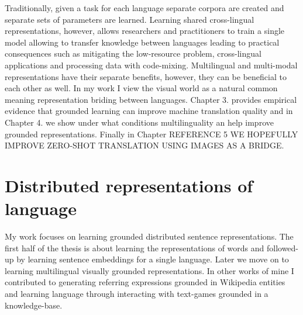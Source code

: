 Traditionally, given a task for each language separate corpora are created and separate sets of parameters are learned.
Learning shared cross-lingual representations, however, allows researchers and practitioners
to train a single model allowing to transfer knowledge between languages leading to practical consequences
such as mitigating the low-resource problem, cross-lingual applications and processing data with code-mixing.
Multilingual and multi-modal representations have their separate benefits, however, they can be beneficial
to each other as well. In my work I view the visual world as a natural common meaning representation briding
between languages. Chapter 3. provides empirical evidence that grounded learning can improve machine
translation quality and in Chapter 4. we show under what conditions multilinguality an help improve grounded
representations. Finally in Chapter REFERENCE 5 WE HOPEFULLY IMPROVE ZERO-SHOT TRANSLATION USING IMAGES AS A BRIDGE.


\section{Distributed representations of language}
My work focuses on learning grounded distributed sentence representations.
The first half of the thesis is about learning the representations of words and followed-up by learning sentence embeddings for a single language. Later we move on to learning multilingual visually grounded representations. In other works of mine I contributed to generating referring expressions grounded in Wikipedia entities and learning language through interacting with text-games grounded in a knowledge-base.

